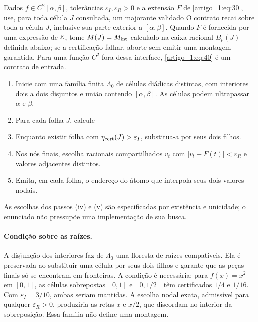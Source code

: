 \begin{algoritmo}\label{map:artigo_1:6.3}
Dados $f\in C^2[\alpha,\beta]$, tolerâncias $\varepsilon_I,\varepsilon_R>0$ e a extensão $F$ de \eqref{artigo_1:eq:30}, use, para toda célula $J$ consultada, um majorante validado
O contrato recai sobre toda a célula $J$, inclusive sua parte exterior a $[\alpha,\beta]$. Quando $F$ é fornecida por uma expressão de $\mathcal E$, tome $M(J)=M_{\rm int}$ calculado na caixa racional $B_p(J)$ definida abaixo; se a certificação falhar, aborte sem emitir uma montagem garantida. Para uma função $C^2$ fora dessa interface, \eqref{artigo_1:eq:40} é um contrato de entrada.
\begin{enumerate}[label=(\roman*),topsep=6pt,itemsep=3pt]
\item Inicie com uma família finita $\Lambda_0$ de células diádicas distintas, com interiores dois a dois disjuntos e união contendo $[\alpha,\beta]$. As células podem ultrapassar $\alpha$ e $\beta$.
\item Para cada folha $J$, calcule
\item Enquanto existir folha com $\eta_{\rm cert}(J)>\varepsilon_I$, substitua-a por seus dois filhos.
\item Nos nós finais, escolha racionais compartilhados $v_t$ com $|v_t-F(t)|<\varepsilon_R$ e valores adjacentes distintos.
\item Emita, em cada folha, o endereço do átomo que interpola seus dois valores nodais.
\end{enumerate}
As escolhas dos passos (iv) e (v) são especificadas por existência e unicidade; o enunciado não pressupõe uma implementação de sua busca.

\paragraph{Condição sobre as raízes.}
A disjunção dos interiores faz de $\Lambda_0$ uma floresta de raízes compatíveis. Ela é preservada ao substituir uma célula por seus dois filhos e garante que as peças finais só se encontram em fronteiras. A condição é necessária: para $f(x)=x^2$ em $[0,1]$, as células sobrepostas $[0,1]$ e $[0,1/2]$ têm certificados $1/4$ e $1/16$. Com $\varepsilon_I=3/10$, ambas seriam mantidas. A escolha nodal exata, admissível para qualquer $\varepsilon_R>0$, produziria as retas $x$ e $x/2$, que discordam no interior da sobreposição. Essa família não define uma montagem.
\end{algoritmo}

